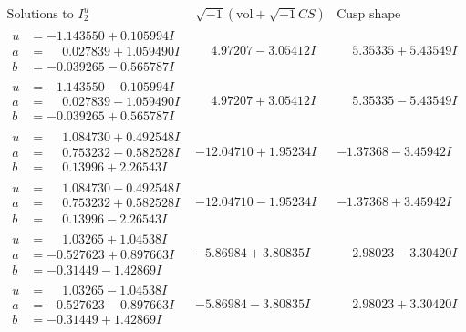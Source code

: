 \documentclass[1p]{elsarticle_modified}
\theoremstyle{definition}
\newcommand{\I}{\sqrt{-1}}
\begin{document}
$$\begin{array}{c|c|c}  
\text{Solutions to }I^u_{2}& \I (\text{vol} + \sqrt{-1}CS) & \text{Cusp shape}\\
 \hline 
\begin{aligned}
u &= -1.143550 + 0.105994 I \\
a &= \phantom{-}0.027839 + 1.059490 I \\
b &= -0.039265 - 0.565787 I\end{aligned}
 & \phantom{-}4.97207 - 3.05412 I & \phantom{-}5.35335 + 5.43549 I \\ \hline\begin{aligned}
u &= -1.143550 - 0.105994 I \\
a &= \phantom{-}0.027839 - 1.059490 I \\
b &= -0.039265 + 0.565787 I\end{aligned}
 & \phantom{-}4.97207 + 3.05412 I & \phantom{-}5.35335 - 5.43549 I \\ \hline\begin{aligned}
u &= \phantom{-}1.084730 + 0.492548 I \\
a &= \phantom{-}0.753232 - 0.582528 I \\
b &= \phantom{-}0.13996 + 2.26543 I\end{aligned}
 & -12.04710 + 1.95234 I & -1.37368 - 3.45942 I \\ \hline\begin{aligned}
u &= \phantom{-}1.084730 - 0.492548 I \\
a &= \phantom{-}0.753232 + 0.582528 I \\
b &= \phantom{-}0.13996 - 2.26543 I\end{aligned}
 & -12.04710 - 1.95234 I & -1.37368 + 3.45942 I \\ \hline\begin{aligned}
u &= \phantom{-}1.03265 + 1.04538 I \\
a &= -0.527623 + 0.897663 I \\
b &= -0.31449 - 1.42869 I\end{aligned}
 & -5.86984 + 3.80835 I & \phantom{-}2.98023 - 3.30420 I \\ \hline\begin{aligned}
u &= \phantom{-}1.03265 - 1.04538 I \\
a &= -0.527623 - 0.897663 I \\
b &= -0.31449 + 1.42869 I\end{aligned}
 & -5.86984 - 3.80835 I & \phantom{-}2.98023 + 3.30420 I \\ \hline\begin{aligned}

\end{aligned}
\end{array}$$
\end{document}
